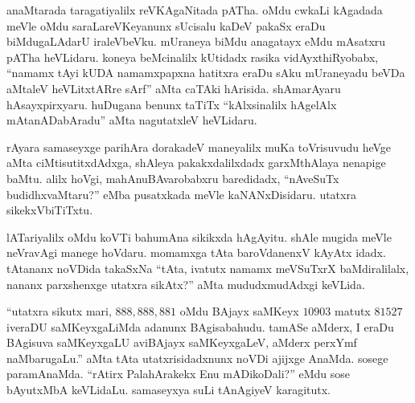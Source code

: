 \vskip 0.15cm

anaMtarada taragatiyalilx reVKAgaNitada pATha. oMdu cwkaLi kAgadada meVle oMdu saraLareVKeyanunx sUcisalu kaDeV pakaSx eraDu biMdugaLAdarU iraleVbeVku. mUraneya biMdu anagatayx eMdu mAsatxru pATha heVLidaru. koneya beMcinalilx kUtidadx rasika vidAyxthiRyobabx, ``namamx tAyi kUDA namamxpapxna hatitxra eraDu sAku mUraneyadu beVDa aMtaleV heVLitxtARre sArf'' aMta caTAki hArisida. shAmarAyaru hAsayxpirxyaru. huDugana benunx taTiTx ``kAlxsinalilx hAgelAlx mAtanADabAradu'' aMta nagutatxleV heVLidaru.

\vskip 0.15cm

rAyara samaseyxge parihAra dorakadeV maneyalilx muKa toVrisuvudu heVge aMta ciMtisutitxdAdxga, shAleya pakakxdalilxdadx garxMthAlaya nenapige baMtu. alilx hoVgi, mahAnuBAvarobabxru baredidadx, ``nAveSuTx budidhxvaMtaru?'' eMba pusatxkada meVle kaNANxDisidaru. utatxra sikekxVbiTiTxtu.

\vskip 0.15cm

lATariyalilx oMdu koVTi bahumAna sikikxda hAgAyitu. shAle mugida meVle neVravAgi manege hoVdaru. momamxga tAta baroVdanenxV kAyAtx idadx. tAtananx noVDida takaSxNa ``tAta, ivatutx namamx meVSuTxrX baMdiralilalx, nananx parxshenxge utatxra sikAtx?'' aMta mududxmudAdxgi keVLida.

\vskip 0.15cm

``utatxra sikutx mari, $888,888,881$ oMdu BAjayx saMKeyx $10903$ matutx $81527$ iveraDU saMKeyxgaLiMda adanunx BAgisabahudu. tamASe aMderx, I eraDu BAgisuva saMKeyxgaLU aviBAjayx saMKeyxgaLeV, aMderx perxYmf naMbarugaLu.'' aMta tAta utatxrisidadxnunx noVDi ajijxge AnaMda. sosege paramAnaMda. ``rAtirx PalahArakekx Enu mADikoDali?'' eMdu sose bAyutxMbA keVLidaLu. samaseyxya suLi tAnAgiyeV karagitutx.



